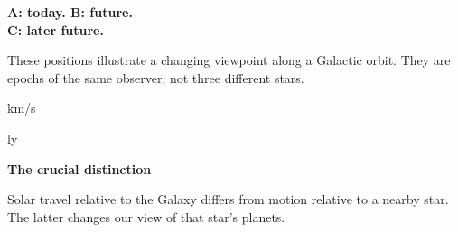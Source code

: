 \vspace{5pt}
\begin{minipage}[t]{.295\linewidth}\vspace{0pt}\setlength{\parskip}{3pt}
 \textbf{A: today. B: future.\\C: later future.}

 These positions illustrate a changing viewpoint along a Galactic orbit. They are epochs of the same observer, not three different stars.

 \vspace{5pt}{\fontsize{24}{26}\selectfont\color{teal}\ReportSolarSpeed}\enspace km/s\par

 \vspace{5pt}{\fontsize{24}{26}\selectfont\color{teal}\ReportCenturyPathLy}\enspace ly\par

 \vspace{5pt}{\fontsize{24}{26}\selectfont\color{teal}\ReportHundredLightYearsRounded}\par

 \vspace{8pt}\textbf{The crucial distinction}\par
 Solar travel relative to the Galaxy differs from motion relative to a nearby star. The latter changes our view of that star's planets.
\end{minipage}\hfill
